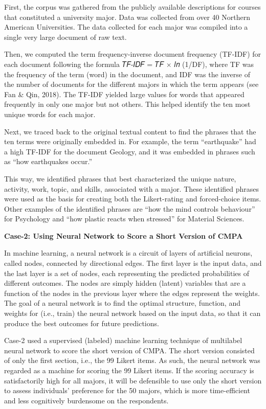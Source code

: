 \documentclass[
]{book}
\begin{document}
First, the corpus was gathered from the publicly available descriptions for courses that constituted a university major. Data was collected from over 40 Northern American Universities. The data collected for each major was compiled into a single very large document of raw text.

Then, we computed the term frequency-inverse document frequency (TF-IDF) for each document following the formula 𝑇𝐹-𝐼𝐷𝐹 = 𝑇𝐹 × 𝑙𝑛 (1/DF), where TF was the frequency of the term (word) in the document, and IDF was the inverse of the number of documents for the different majors in which the term appears (see Fan \& Qin, 2018). The TF-IDF yielded large values for words that appeared frequently in only one major but not others. This helped identify the ten most unique words for each major.

Next, we traced back to the original textual content to find the phrases that the ten terms were originally embedded in. For example, the term ``earthquake'' had a high TF-IDF for the document Geology, and it was embedded in phrases such as ``how earthquakes occur.''

This way, we identified phrases that best characterized the unique nature, activity, work, topic, and skills, associated with a major. These identified phrases were used as the basis for creating both the Likert-rating and forced-choice items. Other examples of the identified phrases are ``how the mind controls behaviour'' for Psychology and ``how plastic reacts when stressed'' for Material Sciences.

\textbf{Case-2: Using Neural Network to Score a Short Version of CMPA}

In machine learning, a neural network is a circuit of layers of artificial neurons, called nodes, connected by directional edges. The first layer is the input data, and the last layer is a set of nodes, each representing the predicted probabilities of different outcomes. The nodes are simply hidden (latent) variables that are a function of the nodes in the previous layer where the edges represent the weights. The goal of a neural network is to find the optimal structure, function, and weights for (i.e., train) the neural network based on the input data, so that it can produce the best outcomes for future predictions.

Case-2 used a supervised (labeled) machine learning technique of multilabel neural network to score the short version of CMPA. The short version consisted of only the first section, i.e., the 99 Likert items. As such, the neural network was regarded as a machine for scoring the 99 Likert items. If the scoring accuracy is satisfactorily high for all majors, it will be defensible to use only the short version to assess individuals' preference for the 50 majors, which is more time-efficient and less cognitively burdensome on the respondents.
\end{document}
